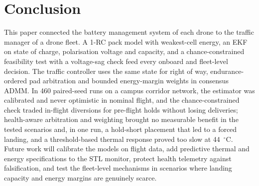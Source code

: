 \documentclass[journal]{IEEEtran}
\begin{document}
\section{Conclusion}\label{sec:conclusion}
This paper connected the battery management system of each drone to the traffic manager of a drone fleet. A 1-RC pack model with weakest-cell energy, an EKF on state of charge, polarisation voltage and capacity, and a chance-constrained feasibility test with a voltage-sag check feed every onboard and fleet-level decision. The traffic controller uses the same state for right of way, endurance-ordered pad arbitration and bounded energy-margin weights in consensus ADMM. In 460 paired-seed runs on a campus corridor network, the estimator was calibrated and never optimistic in nominal flight, and the chance-constrained check traded in-flight diversions for pre-flight holds without losing deliveries; health-aware arbitration and weighting brought no measurable benefit in the tested scenarios and, in one run, a hold-short placement that led to a forced landing, and a threshold-based thermal response proved too slow at 44~$^\circ$C. Future work will calibrate the models on flight data, add predictive thermal and energy specifications to the STL monitor, protect health telemetry against falsification, and test the fleet-level mechanisms in scenarios where landing capacity and energy margins are genuinely scarce.
\end{document}
